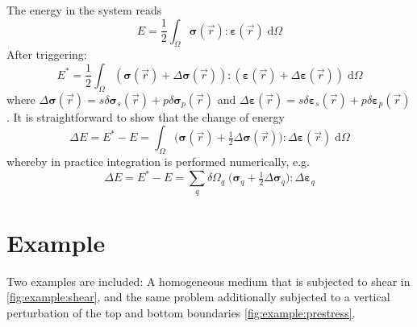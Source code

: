 \documentclass[fleqn]{goose-article}
\begin{document}
The energy in the system reads
\begin{equation}
    E = \frac{1}{2} \int_\Omega
        \bm{\sigma}(\vec{r}) : \bm{\varepsilon}(\vec{r})
    \; \mathrm{d} \Omega
\end{equation}
After triggering:
\begin{equation}
    E^* = \frac{1}{2} \int_\Omega
        (\bm{\sigma}(\vec{r}) + \Delta \bm{\sigma}(\vec{r})) :
        (\bm{\varepsilon}(\vec{r}) + \Delta \bm{\varepsilon}(\vec{r}))
    \; \mathrm{d} \Omega
\end{equation}
where
$\Delta \bm{\sigma}(\vec{r}) = s \delta \bm{\sigma}_s(\vec{r}) + p \delta \bm{\sigma}_p(\vec{r})$
and
$\Delta \bm{\varepsilon}(\vec{r}) = s \delta \bm{\varepsilon}_s(\vec{r}) + p \delta \bm{\varepsilon}_p(\vec{r})$.
It is straightforward to show that the change of energy
\begin{equation}
    \Delta E = E^* - E =
    \int_\Omega
        \big(\bm{\sigma}(\vec{r}) + \tfrac{1}{2} \Delta \bm{\sigma}(\vec{r}) \big) :
        \Delta \bm{\varepsilon}(\vec{r})
    \; \mathrm{d} \Omega
\end{equation}
whereby in practice integration is performed numerically, e.g.\
\begin{equation}
    \Delta E = E^* - E =
    \sum\limits_q
        \delta \Omega_q \;
        \big(\bm{\sigma}_q + \tfrac{1}{2} \Delta \bm{\sigma}_q \big) :
        \Delta \bm{\varepsilon}_q
\end{equation}

\clearpage

\section*{Example}

Two examples are included:
A homogeneous medium that is subjected to shear in \cref{fig:example:shear}, and
the same problem additionally subjected to a vertical perturbation
of the top and bottom boundaries \cref{fig:example:prestress}.
\end{document}
